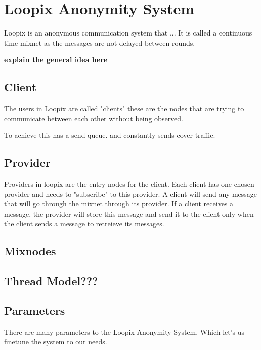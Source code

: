 \documentclass[a4paper,11pt,oneside]{report}
\begin{document}
\section{Loopix Anonymity System}
Loopix is an anonymous communication system that ... It is called a continuous time mixnet as the messages are not delayed between rounds.

\textbf{explain the general idea here}

\subsection{Client}
The users in Loopix are called "clients" these are the nodes that are trying to communicate between each other without being observed.

To achieve this has a send queue. and constantly sends cover traffic.

\subsection{Provider}

Providers in loopix are the entry nodes for the client. Each client has one chosen provider and needs to "subscribe" to this provider. A client will send any message that will go through the mixnet through its provider. If a client receives a message, the provider will store this message and send it to the client only when the client sends a message to retreieve its messages.

\subsection{Mixnodes}

\subsection{Thread Model???}


\subsection{Parameters}
There are many parameters to the Loopix Anonymity System. Which let's us finetune the system to our needs.
\end{document}
